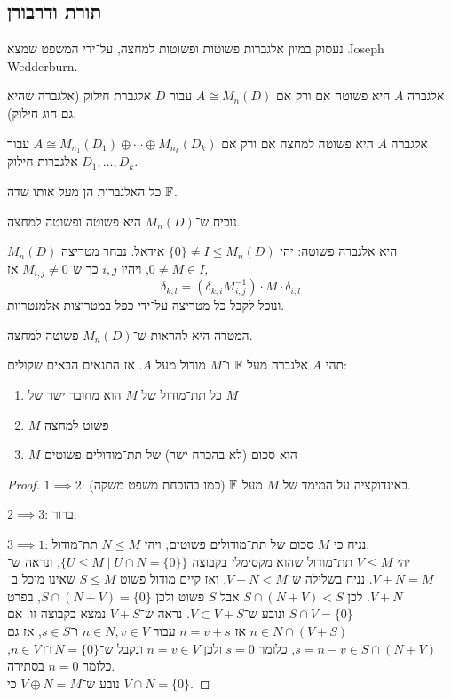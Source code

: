\subsection{תורת ודרבורן}
נעסוק במיון אלגברות פשוטות ופשוטות למחצה, על־ידי המשפט שמצא Joseph Wedderburn.
\begin{theorem}[ודרבורן]
	אלגברה $A$ היא פשוטה אם ורק אם $A \cong M_n(D)$ עבור $D$ אלגברת חילוק (אלגברה שהיא גם חוג חילוק).

	אלגברה $A$ היא פשוטה למחצה אם ורק אם $A \cong M_{n_1}(D_1) \oplus \cdots \oplus M_{n_k}(D_k)$ עבור $D_1, \ldots, D_k$ אלגברות חילוק.
\end{theorem}
\begin{remark}
	כל האלגברות הן מעל אותו שדה $\mathbb{F}$.
\end{remark}
נוכיח ש־$M_n(D)$ היא פשוטה ופשוטה למחצה.
\begin{remark}
	$M_n(D)$ היא אלגברה פשוטה:
	יהי $\{ 0 \} \ne I \le M_n(D)$ אידאל.
	נבחר מטריצה $0 \ne M \in I$, ויהיו $i, j$ כך ש־$M_{i, j} \ne 0$ אז,
	\[
		\delta_{k, l}
		= (\delta_{k, i} M_{i, j}^{-1}) \cdot M \cdot \delta_{i, l}
	\]
	ונוכל לקבל כל מטריצה על־ידי כפל במטריצות אלמנטריות.
\end{remark}
המטרה היא להראות ש־$M_n(D)$ פשוטה למחצה.
\begin{lemma}\label{lemma_equivalency_module_over_algebra}
	תהי $A$ אלגברה מעל $\mathbb{F}$ ו־$M$ מודול מעל $A$.
	אז התנאים הבאים שקולים:
	\begin{enumerate}
		\item כל תת־מודול של $M$ הוא מחובר ישר של $M$
		\item $M$ פשוט למחצה
		\item $M$ הוא סכום (לא בהכרח ישר) של תת־מודולים פשוטים
	\end{enumerate}
\end{lemma}
\begin{proof}
	$1 \implies 2$:
	באינדוקציה על המימד של $M$ מעל $\mathbb{F}$ (כמו בהוכחת משפט משקה).

	$2 \implies 3$:
	ברור.

	$3 \implies 1$:
	נניח כי $M$ סכום של תת־מודולים פשוטים, ויהי $N \le M$ תת־מודול. \\
	יהי $V \le M$ תת־מודול שהוא מקסימלי בקבוצה $\{ U \le M \mid U \cap N = \{ 0 \} \}$, ונראה ש־$V + N = M$.
	נניח בשלילה ש־$V + N < M$, ואז קיים מודול פשוט $S \le M$ שאינו מוכל ב־$V + N$.
	לכן $S \cap (N + V) < S$ אבל $S$ פשוט ולכן $S \cap (N + V) = \{ 0 \}$, בפרט $S \cap V = \{ 0 \}$ ונובע ש־$V \subset V + S$.
	נראה ש־$V + S$ נמצא בקבוצה זו.
	אם $n \in N \cap (V + S)$ אז $n = v + s$ עבור $n \in N, v \in V$ ו־$s \in S$, אז גם $s = n - v \in S \cap (N + V)$, כלומר $s = 0$ ולכן $n = v \in V$ ונקבל ש־$n \in V \cap N = \{ 0 \}$, כלומר $n = 0$ בסתירה. \\
	נובע ש־$V \oplus N = M$ כי $V \cap N = \{ 0 \}$.
\end{proof}
